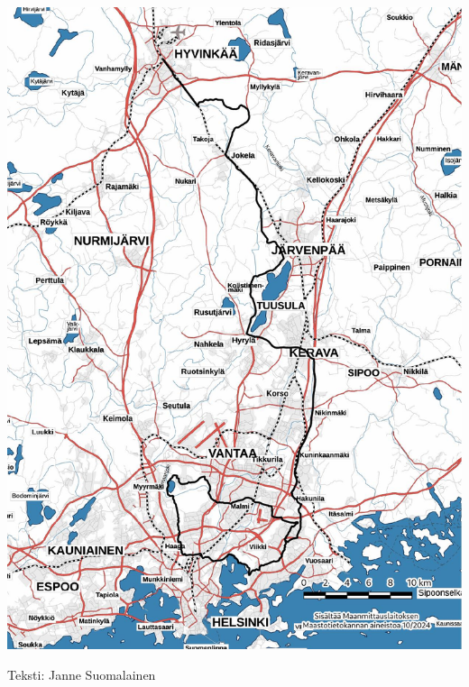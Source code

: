 \begin{multicols}{2}
\begin{Figure}
\noindent\includegraphics[width=\linewidth]{assets/mustaliljareitti.jpg}
\end{Figure}
\end{multicols}

\vspace*{.50cm}
{\raggedleft Teksti: Janne Suomalainen\par}
